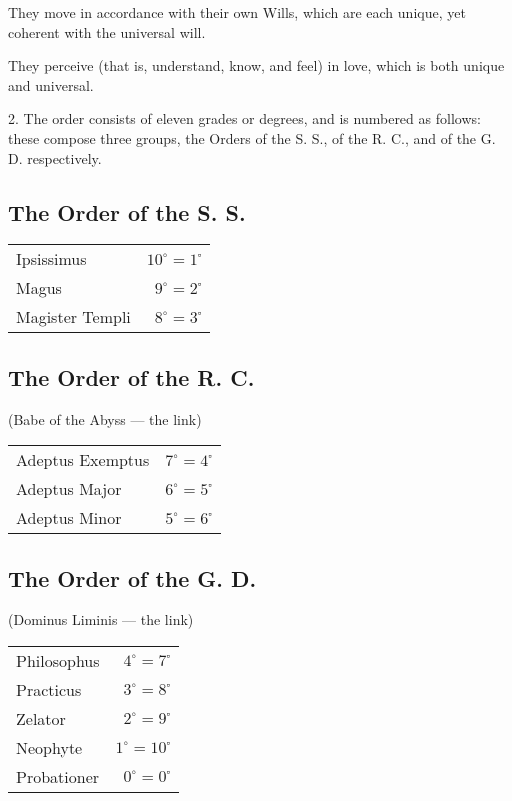 They move in accordance with their own Wills, which are each unique, yet coherent with the universal will.

They perceive (that is, understand, know, and feel) in love, which is both unique and universal.

2. The order consists of eleven grades or degrees, and is numbered as follows: these compose three groups, the Orders of the S. S., of the R. C., and of the G. D. respectively.

\subsection*{The Order of the S. S.}
\begin{center}
  \begin{tabular}{p{} r}
    Ipsissimus \dotfill & $10^{\circ}=1^{\square}$ \\
    Magus \dotfill & $9^{\circ}=2^{\square}$ \\
    Magister Templi \dotfill & $8^{\circ}=3^{\square}$ \\
    \end{tabular}
\end{center}

\subsection*{The Order of the R. C.}
\begin{center}
  (Babe of the Abyss --- the link)

  \begin{tabular}{p{} r}
    Adeptus Exemptus \dotfill & $7^{\circ}=4^{\square}$ \\
    Adeptus Major \dotfill & $6^{\circ}=5^{\square}$ \\
    Adeptus Minor \dotfill & $5^{\circ}=6^{\square}$ \\
  \end{tabular}
\end{center}

\subsection*{The Order of the G. D.}
\begin{center}
  (Dominus Liminis --- the link)

  \begin{tabular}{p{} r}
    Philosophus \dotfill & $4^{\circ}=7^{\square}$ \\
    Practicus \dotfill & $3^{\circ}=8^{\square}$ \\
    Zelator \dotfill & $2^{\circ}=9^{\square}$ \\
    Neophyte \dotfill & $1^{\circ}=10^{\square}$ \\
    Probationer \dotfill & $0^{\circ}=0^{\square}$ \\
  \end{tabular}
\end{center}

